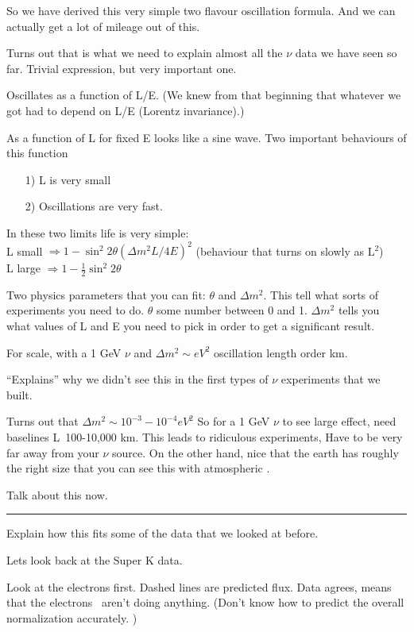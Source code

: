 {So we have derived this very simple two flavour oscillation formula.
And we can actually get a lot of mileage out of this. 

Turns out that is what we need to explain almost all the $\nu$ data we have seen so far. 
Trivial expression, but very important one.

Oscillates as a function of L/E. 
(We knew from that beginning that whatever we got had to depend on L/E (Lorentz invariance).)

As a function of L for fixed E looks like a sine wave.
Two important behaviours of this function
\begin{itemize}
\item[1)] L is very small
\item[2)] Oscillations are very fast. 
\end{itemize}

In these two limits life is very simple:\\
L small  $\Rightarrow 1 - \sin^2 2\theta \left(\Delta m^2 L/4E\right)^2$  (behaviour that turns on slowly as L$^2$)\\
L large  $\Rightarrow 1 - \frac{1}{2}\sin^2 2\theta $  

Two physics parameters that you can fit: $\theta$ and  $\Delta m^2$.
This tell what sorts of experiments you need to do.
$\theta$ some number between 0 and 1. 
$\Delta m^2$ tells you what values of L and E you need to pick in order to get a significant result.

For scale, with a 1 GeV $\nu$ and $\Delta m^2 \sim eV^2$ oscillation length order km. 

``Explains'' why we didn't see this in the first types of $\nu$ experiments that we built.  


Turns out that $\Delta m^2 \sim 10^{-3}-10^{-4}eV^2$
So for a 1 GeV $\nu$ to see large effect, need baselines L~100-10,000 km.  
This leads to ridiculous experiments, Have to be very far away from your $\nu$ source.  
On the other hand, nice that the earth has roughly the right size that you can see this with atmospheric \nus. 

Talk about this now. 

\noindent\rule{\textwidth}{1pt}

Explain how this fits some of the data that we looked at before.

Lets look back at the Super K data. 

Look at the electrons first.
Dashed lines are predicted flux. 
Data agrees, means that the electrons \nus\ aren't doing anything.
(Don't know how to predict the overall normalization accurately. )

}
